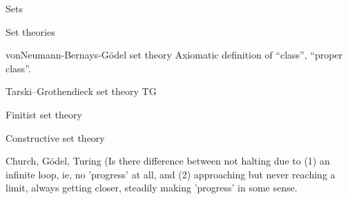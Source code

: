 \begin{plSection}{Sets}
\begin{plSection}{Set theories}
\begin{plSection}{vonNeumann-Bernays-G\"{o}del set theory}
Axiomatic definition of ``class'', ``proper class''.

\end{plSection}%
\begin{plSection}{Tarski–Grothendieck set theory}
\textsf{TG}
\end{plSection}%
\begin{plSection}{Finitist set theory}
\cite{wiki:FinitistSetTheory}
\end{plSection}%
\begin{plSection}{Constructive set theory}
\cite{wiki:ConstructiveSetTheory}
\end{plSection}%
\end{plSection}%
\begin{plSection}{Church, G\"{o}del, Turing}
(Is there difference between 
not halting due to (1) an infinite loop, ie,
no 'progress' at all,
and (2) approaching but never reaching a limit,
always getting closer, steadily making 'progress' in some sense.
\end{plSection}%

\end{plSection}%

